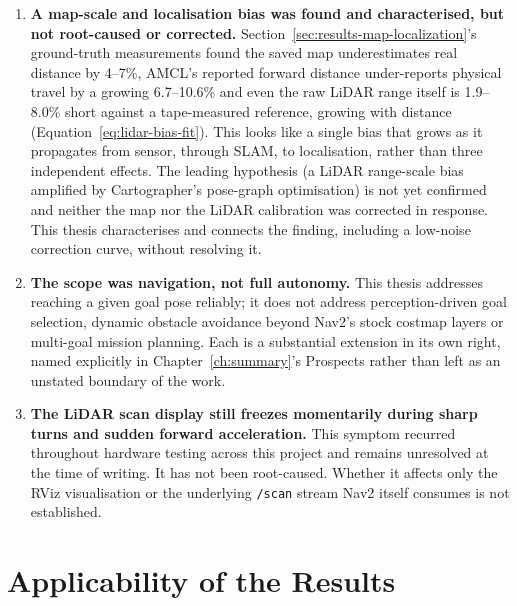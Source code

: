 \begin{enumerate}
    it would require an encoder-feedback velocity loop that this
    thesis does not implement.
  \item \textbf{A map-scale and localisation bias was found and
    characterised, but not root-caused or corrected.}
    Section~\ref{sec:results-map-localization}'s ground-truth
    measurements found the saved map underestimates real distance by
    4--7\%, AMCL's reported forward distance under-reports physical
    travel by a growing 6.7--10.6\% and even the raw LiDAR range
    itself is 1.9--8.0\% short against a tape-measured reference,
    growing with distance (Equation~\ref{eq:lidar-bias-fit}). This
    looks like a single bias that grows as it propagates from sensor,
    through SLAM, to localisation, rather than three independent
    effects. The leading hypothesis (a LiDAR range-scale bias amplified
    by Cartographer's pose-graph optimisation) is not yet confirmed
    and neither the map nor the LiDAR calibration was corrected in
    response. This thesis characterises and connects the finding,
    including a low-noise correction curve, without resolving it.
  \item \textbf{The scope was navigation, not full autonomy.} This
    thesis addresses reaching a given goal pose reliably; it does not
    address perception-driven goal selection, dynamic obstacle
    avoidance beyond Nav2's stock costmap layers or multi-goal
    mission planning. Each is a substantial extension in its own
    right, named explicitly in Chapter~\ref{ch:summary}'s Prospects
    rather than left as an unstated boundary of the work.
  \item \label{item:lidar-render-freeze} \textbf{The LiDAR scan display still freezes momentarily during
    sharp turns and sudden forward acceleration.} This symptom
    recurred throughout hardware testing across this project and
    remains unresolved at the time of writing. It has not been
    root-caused. Whether it affects only the RViz visualisation or
    the underlying \texttt{/scan} stream Nav2 itself consumes is not
    established.
\end{enumerate}

\section{Applicability of the Results}
\label{sec:results-applicability}

